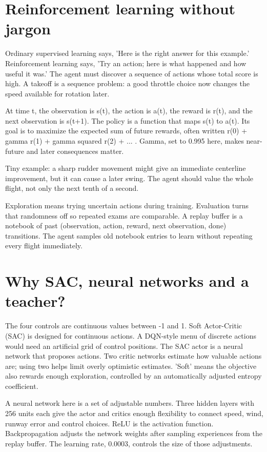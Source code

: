 \documentclass[11pt,a4paper]{article}
\begin{document}
\section{Reinforcement learning without jargon}
Ordinary supervised learning says, 'Here is the right answer for this example.' Reinforcement learning says, 'Try an action; here is what happened and how useful it was.' The agent must discover a sequence of actions whose total score is high. A takeoff is a sequence problem: a good throttle choice now changes the speed available for rotation later.

At time t, the observation is s(t), the action is a(t), the reward is r(t), and the next observation is s(t+1). The policy is a function that maps s(t) to a(t). Its goal is to maximize the expected sum of future rewards, often written r(0) + gamma r(1) + gamma squared r(2) + ... . Gamma, set to 0.995 here, makes near-future and later consequences matter.

Tiny example: a sharp rudder movement might give an immediate centerline improvement, but it can cause a later swing. The agent should value the whole flight, not only the next tenth of a second.

Exploration means trying uncertain actions during training. Evaluation turns that randomness off so repeated exams are comparable. A replay buffer is a notebook of past (observation, action, reward, next observation, done) transitions. The agent samples old notebook entries to learn without repeating every flight immediately.

\section{Why SAC, neural networks and a teacher?}
The four controls are continuous values between -1 and 1. Soft Actor-Critic (SAC) is designed for continuous actions. A DQN-style menu of discrete actions would need an artificial grid of control positions. The SAC actor is a neural network that proposes actions. Two critic networks estimate how valuable actions are; using two helps limit overly optimistic estimates. 'Soft' means the objective also rewards enough exploration, controlled by an automatically adjusted entropy coefficient.

A neural network here is a set of adjustable numbers. Three hidden layers with 256 units each give the actor and critics enough flexibility to connect speed, wind, runway error and control choices. ReLU is the activation function. Backpropagation adjusts the network weights after sampling experiences from the replay buffer. The learning rate, 0.0003, controls the size of those adjustments.
\end{document}
